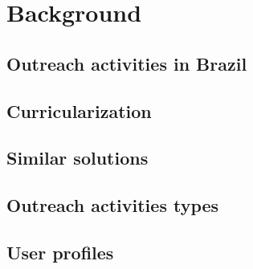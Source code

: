 \chapter{Background}\label{background}

\section{Outreach activities in Brazil}\label{sec:bac-1}

\section{Curricularization}\label{sec:bac-2}

\section{Similar solutions}\label{sec:bac-3}

\section{Outreach activities types}\label{sec:bac-4}

\section{User profiles}\label{sec:bac-5}